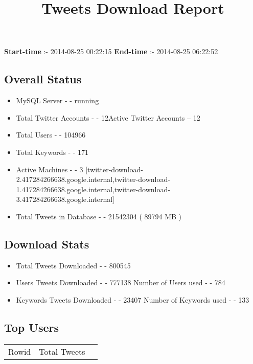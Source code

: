 \documentclass{article}\usepackage[T1]{fontenc}
\begin{document}
\title{\textbf{Tweets Download Report}}
               \date{}
                \maketitle
               \centerline{\textbf{Start-time} :- 2014-08-25 00:22:15 \hspace{40pt} \textbf{End-time} :- 2014-08-25 06:22:52}               \subsection*{Overall Status}                \begin{itemize}                \item MySQL Server - - running               \item Total Twitter Accounts - - 12\newline Active Twitter Accounts -- 12               \item Total Users - - 104966               \item Total Keywords - - 171               \item Active Machines - - 3 [twitter-download-2.417284266638.google.internal,twitter-download-1.417284266638.google.internal,twitter-download-3.417284266638.google.internal]               \item Total Tweets in Database - - 21542304 ( 89794 MB )               \end{itemize}               \subsection*{Download Stats}                \begin{itemize}                \item Total Tweets Downloaded - - 800545               \item Users Tweets Downloaded - - 777138 \newline Number of Users used - - 784               \item Keywords Tweets Downloaded - - 23407 \newline Number of Keywords used - - 133              \end{itemize}              \subsection*{Top Users}\begin{tabular}{|c|c|c|}         \hline         Rowid & Total Tweets \\ 

\end{tabular}
\end{document}
